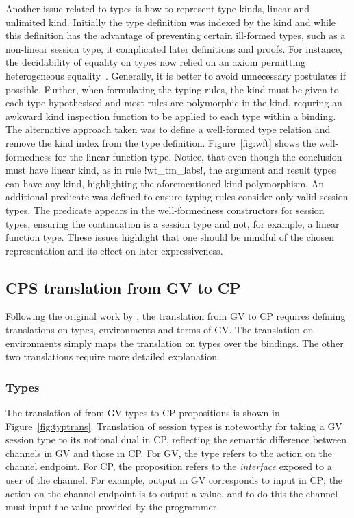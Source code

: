 Another issue related to types is how to represent type kinds, linear and
unlimited kind. Initially the type definition was indexed by the kind and
while this definition has the advantage of preventing certain ill-formed
types, such as a non-linear session type, it complicated later definitions and
proofs. For instance, the decidability of equality on types now relied on an
axiom permitting heterogeneous equality~\cite{McBride:1999}. Generally, it is
better to avoid unnecessary postulates if possible. Further, when formulating
the typing rules, the kind must be given to each type hypothesised and most
rules are polymorphic in the kind, requring an awkward kind inspection
function to be applied to each type within a binding. The alternative approach
taken was to define a well-formed type relation and remove the kind index from
the type definition. Figure~\ref{fig:wft} shows the well-formedness for the
linear function type. Notice, that even though the conclusion must have linear
kind, as in rule \coqe!wt_tm_labs!, the argument and result types can have any
kind, highlighting the aforementioned kind polymorphism. An additional
predicate was defined to ensure typing rules consider only valid session
types. The predicate appears in the well-formedness constructors for session
types, ensuring the continuation is a session type and not, for example, a
linear function type. These issues highlight that one should be mindful of the
chosen representation and its effect on later expressiveness.

\subsection{CPS translation from GV to CP}\label{sec:trans}

Following the original work by \citeauthor{Wadler:2014}, the translation from
GV to CP requires defining translations on types, environments and terms of
GV. The translation on environments simply maps the translation on types over
the bindings. The other two translations require more detailed explanation.

\subsubsection{Types}



The translation of from GV types to CP propositions is shown in
Figure~\ref{fig:typtrans}. Translation of session types is noteworthy for
taking a GV session type to its notional dual in CP, reflecting the semantic
difference between channels in GV and those in CP. For GV, the type refers to
the action on the channel endpoint. For CP, the proposition refers to the
\textit{interface} exposed to a user of the channel. For example, output in GV
corresponds to input in CP; the action on the channel endpoint is to output a
value, and to do this the channel must input the value provided by the
programmer.

